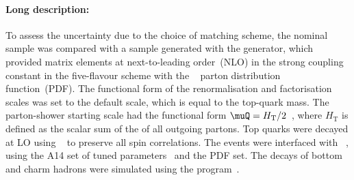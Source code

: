 \paragraph{Long description:}

To assess the uncertainty due to the choice of matching scheme, the nominal sample was compared with a sample generated
with the \MGNLO[2.6.2] generator, which provided matrix elements at next-to-leading order~(NLO) in the strong coupling constant \alphas
in the five-flavour scheme with the \NNPDF[3.0nlo]~\cite{Ball:2014uwa} parton distribution function~(PDF).
The functional form of the renormalisation and factorisation scales was set to the default scale, which is equal to the top-quark mass.
The parton-shower starting scale had the functional form $\muQ = H_{\mathrm T}/2$~\cite{ATL-PHYS-PUB-2017-007}, 
where $H_{\mathrm T}$ is defined as the scalar sum of the \pT of all outgoing partons.
Top quarks were decayed at LO using \MADSPIN~\cite{Frixione:2007zp,Artoisenet:2012st} to preserve all spin correlations.
The events were interfaced with \PYTHIA[8.230]~\cite{Sjostrand:2014zea}, using the A14 set of tuned parameters~\cite{ATL-PHYS-PUB-2014-021} 
and the \NNPDF[2.3lo] PDF set.
The decays of bottom and charm hadrons were simulated using the \EVTGEN[1.6.0] program~\cite{Lange:2001uf}.
